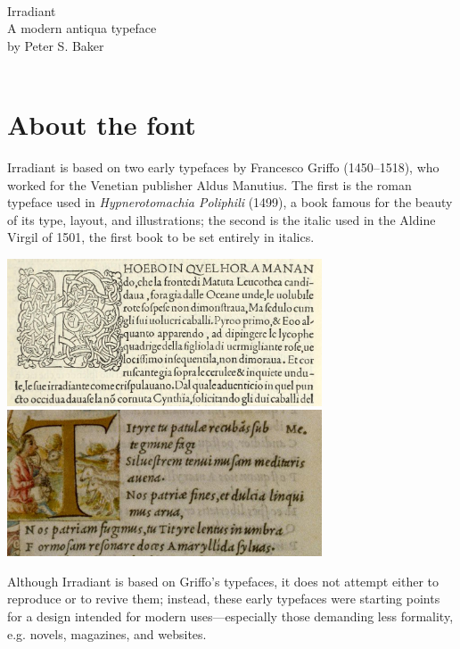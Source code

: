 \documentclass[12pt]{book}
\begin{document}
\begin{titlepage}
\hrulefill\\
\Huge \centering \textcolor{BrickRed}{Irradiant} \\[1cm]
\huge \centering A modern antiqua typeface \\[1cm]
\large \centering by {Peter S. Baker}\\[1cm]
\huge{} \\
\hrulefill
\end{titlepage}
\cleardoublepage

\section*{About the font}

Irradiant is based on two early typefaces by Francesco Griffo
(1450–1518), who worked for the Venetian publisher Aldus Manutius. The
first is the roman typeface used in \textit{Hypnerotomachia Poliphili}
(1499), a book famous for the beauty of its type, layout, and
illustrations; the second is the italic used in the Aldine Virgil of
1501, the first book to be set entirely in italics.

\begin{center}
\includegraphics[width=0.7\textwidth]{hypnerotomachia_sample}\\[1ex]

\includegraphics[width=0.7\textwidth]{Virgil_sample}
\end{center}

Although Irradiant is based on Griffo's typefaces, it does not attempt
either to reproduce or to revive them; instead, these early typefaces
were starting points for a design intended for modern
uses---especially those demanding less formality, e.g. novels, magazines, and
websites.
\end{document}
